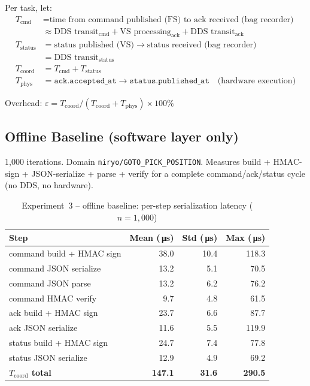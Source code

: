 \documentclass[11pt,a4paper]{article}
\newcommand{\us}{\,\si{\micro s}}
\begin{document}
Per task, let:
\begin{align*}
  T_{\text{cmd}} &= \text{time from command published (FS) to ack received
    (bag recorder)}\\
                 &\approx \text{DDS transit}_{\text{cmd}} +
                   \text{VS processing}_{\text{ack}} +
                   \text{DDS transit}_{\text{ack}}\\[4pt]
  T_{\text{status}} &= \text{status published (VS)} \to
    \text{status received (bag recorder)}\\
                    &= \text{DDS transit}_{\text{status}}\\[4pt]
  T_{\text{coord}} &= T_{\text{cmd}} + T_{\text{status}}\\[4pt]
  T_{\text{phys}}  &= \texttt{ack.accepted\_at} \to
    \texttt{status.published\_at}
    \quad\text{(hardware execution)}
\end{align*}

\noindent Overhead: $\varepsilon = T_{\text{coord}} /
(T_{\text{coord}} + T_{\text{phys}}) \times 100\%$

\subsection{Offline Baseline (software layer only)}

1{,}000 iterations. Domain \texttt{niryo/GOTO\_PICK\_POSITION}.
Measures build + HMAC-sign + JSON-serialize + parse + verify for a complete
command/ack/status cycle (no DDS, no hardware).

\begin{table}[h]
\centering
\caption{Experiment~3 -- offline baseline: per-step serialization latency
  ($n = 1{,}000$)}
\label{tab:exp3-offline}
\begin{tabular}{@{}lrrr@{}}
\toprule
\textbf{Step} & \textbf{Mean (\us)} & \textbf{Std (\us)} & \textbf{Max (\us)} \\
\midrule
command build + HMAC sign  & 38.0 &  10.4 & 118.3 \\
command JSON serialize      & 13.2 &   5.1 &  70.5 \\
command JSON parse          & 13.2 &   6.2 &  76.2 \\
command HMAC verify         &  9.7 &   4.8 &  61.5 \\
ack build + HMAC sign       & 23.7 &   6.6 &  87.7 \\
ack JSON serialize          & 11.6 &   5.5 & 119.9 \\
status build + HMAC sign    & 24.7 &   7.4 &  77.8 \\
status JSON serialize       & 12.9 &   4.9 &  69.2 \\
\midrule
\textbf{$T_{\text{coord}}$ total} & \textbf{147.1} & \textbf{31.6} & \textbf{290.5} \\
\bottomrule
\end{tabular}
\end{table}
\end{document}
